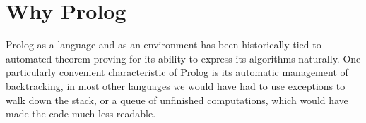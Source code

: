 % 





\section{Why Prolog}
Prolog as a language and as an environment has been historically tied to automated theorem proving for its ability to express its algorithms naturally.
One particularly convenient characteristic of Prolog is its automatic management of backtracking, in most other languages we would have had to use exceptions to walk down the stack, or a queue of unfinished computations, which would have made the code much less readable.

